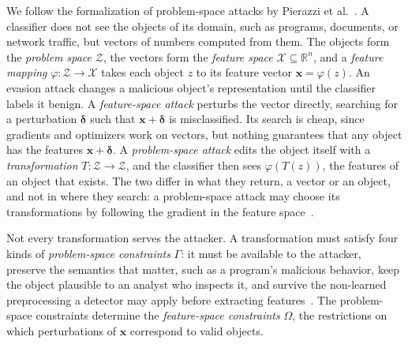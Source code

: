 
We follow the formalization of problem-space attacks by Pierazzi et al.~\cite{pierazzi2020intriguing}. A classifier
does not see the objects of its domain, such as programs, documents, or network traffic, but vectors of numbers
computed from them. The objects form the \emph{problem space} $\mathcal{Z}$, the vectors form the \emph{feature space}
$\mathcal{X} \subseteq \mathbb{R}^n$, and a \emph{feature mapping} $\varphi: \mathcal{Z} \to \mathcal{X}$ takes each
object $z$ to its feature vector $\mathbf{x} = \varphi(z)$. An evasion attack changes a malicious object's
representation until the classifier labels it benign. A \emph{feature-space attack} perturbs the vector directly,
searching for a perturbation $\boldsymbol{\delta}$ such that $\mathbf{x} + \boldsymbol{\delta}$ is misclassified. Its
search is cheap, since gradients and optimizers work on vectors, but nothing guarantees that any object has the features
$\mathbf{x} + \boldsymbol{\delta}$. A \emph{problem-space attack} edits the object itself with a \emph{transformation}
$T: \mathcal{Z} \to \mathcal{Z}$, and the classifier then sees $\varphi(T(z))$, the features of an object that exists.
The two differ in what they return, a vector or an object, and not in where they search: a problem-space attack may
choose its transformations by following the gradient in the feature space~\cite{pierazzi2020intriguing}.

Not every transformation serves the attacker. A transformation must satisfy four kinds of \emph{problem-space
constraints} $\Gamma$: it must be available to the attacker, preserve the semantics that matter, such as a program's
malicious behavior, keep the object plausible to an analyst who inspects it, and survive the non-learned preprocessing
a detector may apply before extracting features~\cite{pierazzi2020intriguing}. The problem-space constraints determine
the \emph{feature-space constraints} $\Omega$, the restrictions on which perturbations of $\mathbf{x}$ correspond to
valid objects.

